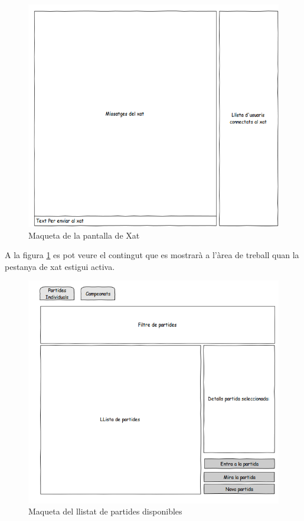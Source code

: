 \begin{figure}[htbp]
\centering\includegraphics[width=14cm]{img/Xat.png}
\caption{Maqueta de la pantalla de Xat}
\label{fig:mookup-xat}
\end{figure} 

A la figura \ref{fig:mookup-xat} es pot veure el contingut que es mostrarà a l'àrea de treball quan la pestanya de xat estigui activa. 

\begin{figure}[htbp]
\centering\includegraphics[width=14cm]{img/Llista_Partides.png}
\caption{Maqueta del llistat de partides disponibles}
\label{fig:mookup-partides}
\end{figure} 

